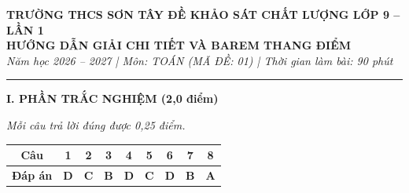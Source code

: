 \documentclass[12pt,a4paper]{article}
\begin{document}
\begin{center}
  {\bfseries\large TRƯỜNG THCS SƠN TÂY \hfill ĐỀ KHẢO SÁT CHẤT LƯỢNG LỚP 9 -- LẦN 1}\\
  \vspace{1mm}
  {\bfseries\Large HƯỚNG DẪN GIẢI CHI TIẾT VÀ BAREM THANG ĐIỂM}\\
  \vspace{1mm}
  \textit{Năm học 2026 -- 2027 | Môn: TOÁN (MÃ ĐỀ: 01) | Thời gian làm bài: 90 phút}
\end{center}
\vspace{-1.5mm}
\hrule
\vspace{2.5mm}

\noindent\textbf{\large I. PHẦN TRẮC NGHIỆM (2,0 điểm)}

\textit{Mỗi câu trả lời đúng được 0,25 điểm.}

\begin{center}
\begin{tabular}{|c|c|c|c|c|c|c|c|c|}
\hline
\textbf{Câu} & \textbf{1} & \textbf{2} & \textbf{3} & \textbf{4} & \textbf{5} & \textbf{6} & \textbf{7} & \textbf{8} \\
\hline
\textbf{Đáp án} & \textbf{D} & \textbf{C} & \textbf{B} & \textbf{D} & \textbf{C} & \textbf{D} & \textbf{B} & \textbf{A} \\
\hline
\end{tabular}
\end{center}
\vspace{1.5mm}
\end{document}
